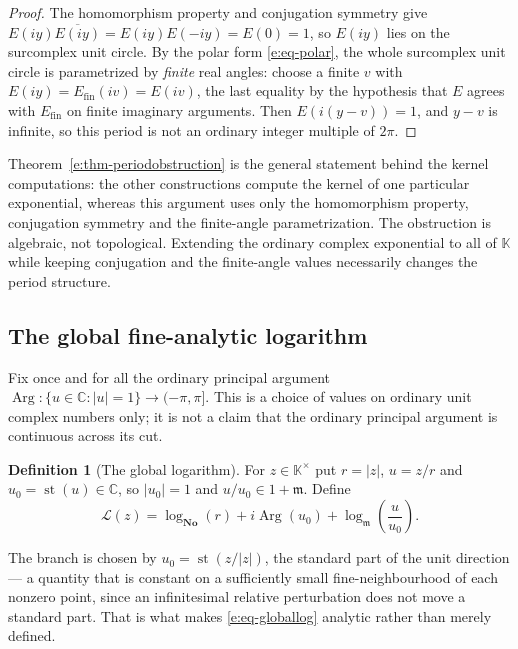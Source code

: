 \documentclass[11pt,a4paper]{article}
\numberwithin{equation}{section}
\theoremstyle{definition}
\newtheorem{definition}[theorem]{Definition}
\theoremstyle{remark}
\theoremstyle{plain}
\newcommand{\K}{\mathbb K}
\newcommand{\No}{\mathbf{No}}
\newcommand{\CC}{\mathbb C}
\newcommand{\mm}{\mathfrak m}
\DeclareMathOperator{\st}{st}
\DeclareMathOperator{\Arg}{Arg}
\newcommand{\abs}[1]{\lvert #1\rvert}
\begin{document}
\begin{proof}
The homomorphism property and conjugation symmetry give
$E(iy)\overline{E(iy)}=E(iy)E(-iy)=E(0)=1$, so $E(iy)$ lies on the
surcomplex unit circle.  By the polar form
\eqref{e:eq-polar}, the whole surcomplex unit circle is parametrized by
\emph{finite} real angles: choose a finite $v$ with
$E(iy)=E_{\mathrm{fin}}(iv)=E(iv)$, the last equality by the hypothesis
that $E$ agrees with $E_{\mathrm{fin}}$ on finite imaginary arguments.
Then $E(i(y-v))=1$, and $y-v$ is infinite, so this period is not an
ordinary integer multiple of $2\pi$.
\end{proof}

Theorem~\ref{e:thm-periodobstruction} is the general statement behind the
kernel computations: the other constructions compute the kernel of one
particular exponential, whereas this argument uses only the homomorphism
property, conjugation symmetry and the finite-angle parametrization.  The
obstruction is algebraic, not topological.  Extending the ordinary complex
exponential to all of $\K$ while keeping conjugation and the finite-angle
values necessarily changes the period structure.

\subsection{The global fine-analytic logarithm}\label{e:sec-globallog}

Fix once and for all the ordinary principal argument
$\Arg:\{u\in\CC:\abs u=1\}\to(-\pi,\pi]$.  This is a choice of values on
ordinary unit complex numbers only; it is not a claim that the ordinary
principal argument is continuous across its cut.

\begin{definition}[The global logarithm]\label{e:def-globallog}
For $z\in\K^{\times}$ put $r=\abs z$, $u=z/r$ and $u_0=\st(u)\in\CC$, so
$\abs{u_0}=1$ and $u/u_0\in1+\mm$.  Define
\begin{equation}\label{e:eq-globallog}
 \mathcal L(z)=\log_{\No}(r)+i\Arg(u_0)+\log_{\mm}\!\left(\frac{u}{u_0}\right).
\end{equation}
\end{definition}

The branch is chosen by $u_0=\st(z/\abs z)$, the standard part of the unit
direction --- a quantity that is constant on a sufficiently small
fine-neighbourhood of each nonzero point, since
an infinitesimal relative perturbation does not move a standard part.  That
is what makes \eqref{e:eq-globallog} analytic rather than merely defined.
\end{document}
